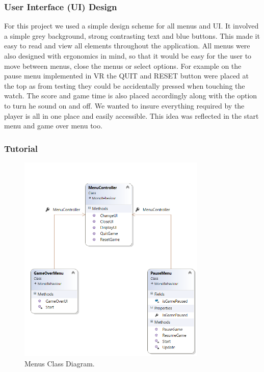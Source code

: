 \subsubsection{User Interface (UI) Design}
For this project we used a simple design scheme for all menus and UI. It involved a simple grey background, strong contrasting text and blue buttons. This made it easy to read and view all elements throughout the application. All menus were also designed with ergonomics in mind, so that it would be easy for the user to move between menus, close the menus or select options. For example on the pause menu implemented in VR the QUIT and RESET button were placed at the top as from testing they could be accidentally pressed when touching the watch. The score and game time is also placed accordingly along with the option to turn he sound on and off. We wanted to insure everything required by the player is all in one place and easily accessible. This idea was reflected in the start menu and game over menu too.

\subsubsection{Tutorial}



\begin{figure}[h!]
	\caption{Menus Class Diagram.}
	\label{image:Menus}
	\centering
	\includegraphics[width=0.8\textwidth]{Images/ClassDiagram Menus.png}
\end{figure}


